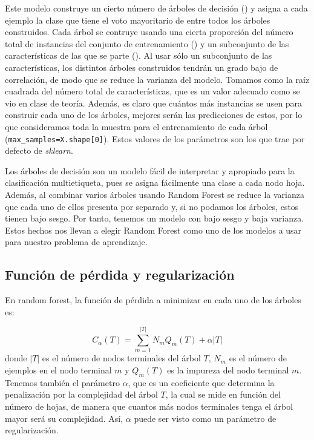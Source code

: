 \documentclass[a4]{article}
\begin{document}
Este modelo construye un cierto número de árboles de decisión () y asigna a cada ejemplo la clase que tiene el voto mayoritario de entre todos los árboles construidos. Cada árbol se contruye usando una cierta proporción del número total de instancias del conjunto de entrenamiento () y un subconjunto de las características de las que se parte (). Al usar sólo un subconjunto de las características, los distintos árboles construidos tendrán un grado bajo de correlación, de modo que se reduce la varianza del modelo. Tomamos como  la raíz cuadrada del número total de características, que es un valor adecuado como se vio en clase de teoría. Además, es claro que cuántos más instancias se usen para construir cada uno de los árboles, mejores serán las predicciones de estos, por lo que consideramos toda la muestra para el entrenamiento de cada árbol  (\lstinline{max_samples=X.shape[0]}). Estos valores de los parámetros son los que trae por defecto  de \textit{sklearn}. 

Los árboles de decisión son un modelo fácil de interpretar y apropiado para la clasificación multietiqueta, pues se asigna fácilmente una clase a cada nodo hoja. Además, al combinar varios árboles usando Random Forest se reduce la varianza que cada uno de ellos presenta por separado y, si no podamos los árboles, estos tienen bajo sesgo. Por tanto, tenemos un modelo con bajo sesgo y baja varianza. Estos hechos nos llevan a elegir Random Forest como uno de los modelos a usar para nuestro problema de aprendizaje. 

\subsection{Función de pérdida y regularización}

En random forest, la función de pérdida a minimizar en cada uno de los árboles es:

\[C_{\alpha}(T) = \sum\limits_{m=1}^{|T|} N_mQ_m(T) + \alpha|T|\] donde $|T|$
es el número de nodos terminales del árbol $T$, $N_m$ es el número de
ejemplos en el nodo terminal $m$ y $Q_m(T)$ es la impureza del nodo terminal $m$. Tenemos también el parámetro $\alpha$, que es un coeficiente que determina la penalización por la complejidad del árbol $T$, la cual se mide en función del número de hojas, de manera que cuantos más nodos terminales tenga el árbol mayor será su complejidad. Así,  $\alpha$ puede ser visto como un parámetro de regularización. 
\end{document}
